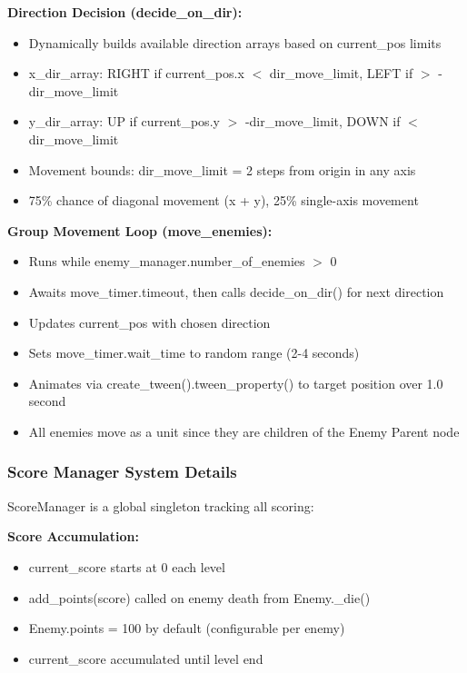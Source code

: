 \documentclass{article}
\begin{document}
\textbf{Direction Decision (decide\_on\_dir):}
\begin{itemize}
    \item Dynamically builds available direction arrays based on current\_pos limits
    \item x\_dir\_array: RIGHT if current\_pos.x $<$ dir\_move\_limit, LEFT if $>$ -dir\_move\_limit
    \item y\_dir\_array: UP if current\_pos.y $>$ -dir\_move\_limit, DOWN if $<$ dir\_move\_limit
    \item Movement bounds: dir\_move\_limit = 2 steps from origin in any axis
    \item 75\% chance of diagonal movement (x + y), 25\% single-axis movement
\end{itemize}

\textbf{Group Movement Loop (move\_enemies):}
\begin{itemize}
    \item Runs while enemy\_manager.number\_of\_enemies $>$ 0
    \item Awaits move\_timer.timeout, then calls decide\_on\_dir() for next direction
    \item Updates current\_pos with chosen direction
    \item Sets move\_timer.wait\_time to random range (2-4 seconds)
    \item Animates via create\_tween().tween\_property() to target position over 1.0 second
    \item All enemies move as a unit since they are children of the Enemy Parent node
\end{itemize}

\subsubsection{Score Manager System Details}

ScoreManager is a global singleton tracking all scoring:

\textbf{Score Accumulation:}
\begin{itemize}
    \item current\_score starts at 0 each level
    \item add\_points(score) called on enemy death from Enemy.\_die()
    \item Enemy.points = 100 by default (configurable per enemy)
    \item current\_score accumulated until level end
\end{itemize}
\end{document}
